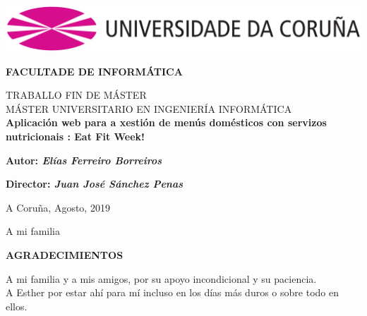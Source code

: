 \documentclass[12pt, a4paper, twoside]{book}
\begin{document}
	
	
	\thispagestyle{empty} 	
	
	\begin{center}		
		\includegraphics[width=15cm]{Imagenes/Simbolo_logo_UDC.png}
	\end{center}
	
	\vspace{2cm}
	
	\begin{center}		
		{\textbf{ FACULTADE DE INFORMÁTICA}}
			
		\vspace{1cm}
		\LARGE{ TRABALLO FIN DE MÁSTER }	\\
		\LARGE{ MÁSTER UNIVERSITARIO EN INGENIERÍA INFORMÁTICA } \\
		\vspace{1cm}	
		\LARGE{\textbf{ Aplicación web para a xestión de menús domésticos con servizos nutricionais : Eat Fit Week! }}
	\end{center}
	
	\vspace{2cm}
	\hfill \textbf{Autor: \textit{Elías Ferreiro Borreiros}}
	
	
	\hfill \textbf{Director: \textit{Juan José Sánchez Penas}} 
	
	
	\hfill A Coruña, Agosto, 2019					
	
	
	\clearpage
	
	\vspace*{\fill}
	\hfill A mi familia
	\vspace*{\fill}
	
	
	\clearpage
	
	\begin{center}
		\LARGE{\textbf{ AGRADECIMIENTOS }}	
	\end{center}	
	A mi familia y a mis amigos, por su apoyo incondicional y su paciencia.\\
	A Esther por estar ahí para mí incluso en los días más duros o sobre todo en ellos.
	
	\clearpage
	
\end{document}
